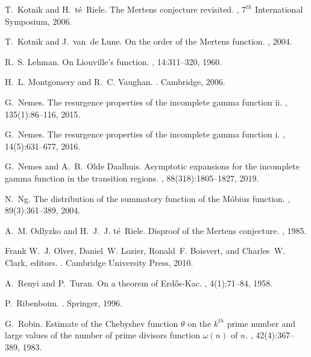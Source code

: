 \documentclass[11pt,reqno,a4letter]{article}
\numberwithin{figure}{section}
\numberwithin{table}{section}
\theoremstyle{plain}
\numberwithin{theorem}{section}
\theoremstyle{definition}
\begin{document}
\begin{thebibliography}{10}
T.~Kotnik and H.~t{\'{e}}~Riele.
\newblock The {M}ertens conjecture revisited.
, $7^{th}$ International Symposium,
  2006.

T.~Kotnik and J.~van~de Lune.
\newblock On the order of the {M}ertens function.
, 2004.

R.~S. Lehman.
\newblock On {L}iouville's function.
, 14:311--320, 1960.

H.~L. Montgomery and R.~C. Vaughan.
.
\newblock Cambridge, 2006.

G.~Nemes.
\newblock The resurgence properties of the incomplete gamma function ii.
, 135(1):86--116, 2015.

G.~Nemes.
\newblock The resurgence properties of the incomplete gamma function i.
, 14(5):631--677, 2016.

G.~Nemes and A.~B.~Olde Daalhuis.
\newblock Asymptotic expansions for the incomplete gamma function in the
  transition regions.
, 88(318):1805--1827, 2019.

N.~Ng.
\newblock The distribution of the summatory function of the {M}{\'{o}}bius
  function.
, 89(3):361--389, 2004.

A.~M. Odlyzko and H.~J.~J. t{\'{e}}~Riele.
\newblock Disproof of the {M}ertens conjecture.
, 1985.

Frank W.~J. Olver, Daniel~W. Lozier, Ronald~F. Boisvert, and Charles~W. Clark,
  editors.
.
\newblock Cambridge University Press, 2010.

A.~Renyi and P.~Turan.
\newblock On a theorem of {E}rd{\H{o}}s-{K}ac.
, 4(1):71--84, 1958.

P.~Ribenboim.
.
\newblock Springer, 1996.

G.~Robin.
\newblock Estimate of the {C}hebyshev function $\theta$ on the $k^{th}$ prime
  number and large values of the number of prime divisors function $\omega(n)$
  of $n$.
, 42(4):367--389, 1983.


\end{thebibliography}
\end{document}

